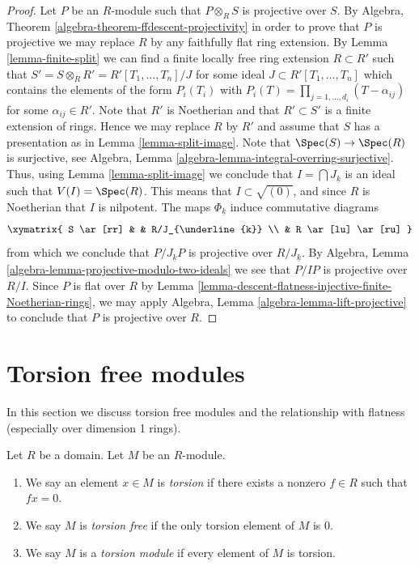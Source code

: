 \begin{proof}
Let $P$ be an $R$-module such that $P \otimes_R S$ is projective over $S$. By
Algebra, Theorem \ref{algebra-theorem-ffdescent-projectivity}
in order to prove that $P$ is projective we may replace $R$
by any faithfully flat ring extension. By
Lemma \ref{lemma-finite-split}
we can find a finite locally free ring extension $R \subset R'$ such
that $S' = S \otimes_R R' = R'[T_1, \ldots, T_n]/J$ for some ideal
$J \subset R'[T_1, \ldots, T_n]$ which contains the  elements of the form
$P_i(T_i)$ with $P_i(T) = \prod_{j = 1, \ldots, d_i} (T - \alpha_{ij})$
for some $\alpha_{ij} \in R'$. Note that $R'$ is Noetherian
and that $R' \subset S'$ is a finite extension of rings. Hence we may
replace $R$ by $R'$ and assume that $S$ has a presentation as in
Lemma \ref{lemma-split-image}.
Note that $\Spec(S) \to \Spec(R)$ is surjective, see
Algebra, Lemma \ref{algebra-lemma-integral-overring-surjective}.
Thus, using Lemma \ref{lemma-split-image}
we conclude that $I = \bigcap J_{\underline{k}}$ is an ideal
such that $V(I) = \Spec(R)$. This means that
$I \subset \sqrt{(0)}$, and since $R$ is Noetherian that $I$
is nilpotent. The maps $\Phi_{\underline{k}}$ induce commutative
diagrams
$$
\xymatrix{
S \ar[rr] & & R/J_{\underline{k}} \\
& R \ar[lu] \ar[ru]
}
$$
from which we conclude that $P/J_{\underline{k}}P$ is projective over
$R/J_{\underline{k}}$. By
Algebra, Lemma \ref{algebra-lemma-projective-modulo-two-ideals}
we see that $P/IP$ is projective over $R/I$. Since $P$ is flat
over $R$ by
Lemma \ref{lemma-descent-flatness-injective-finite-Noetherian-rings},
we may apply Algebra, Lemma \ref{algebra-lemma-lift-projective} to
conclude that $P$ is projective over $R$.
\end{proof}









\section{Torsion free modules}
\label{section-torsion-flat}

\noindent
In this section we discuss torsion free modules and the relationship
with flatness (especially over dimension 1 rings).

\begin{definition}
\label{definition-torsion}
Let $R$ be a domain. Let $M$ be an $R$-module.
\begin{enumerate}
\item We say an element $x \in M$ is {\it torsion} if there exists
a nonzero $f \in R$ such that $fx = 0$.
\item We say $M$ is {\it torsion free} if the only torsion element of $M$
is $0$.
\item We say $M$ is a {\it torsion module} if every element of $M$
is torsion.
\end{enumerate}
\end{definition}

